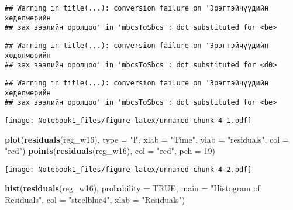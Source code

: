 \documentclass[]{article}
\newenvironment{Shaded}{\begin{snugshade}}{\end{snugshade}}
\newcommand{\DataTypeTok}[1]{\textcolor[rgb]{0.13,0.29,0.53}{#1}}
\newcommand{\DecValTok}[1]{\textcolor[rgb]{0.00,0.00,0.81}{#1}}
\newcommand{\KeywordTok}[1]{\textcolor[rgb]{0.13,0.29,0.53}{\textbf{#1}}}
\newcommand{\NormalTok}[1]{#1}
\newcommand{\OperatorTok}[1]{\textcolor[rgb]{0.81,0.36,0.00}{\textbf{#1}}}
\newcommand{\OtherTok}[1]{\textcolor[rgb]{0.56,0.35,0.01}{#1}}
\newcommand{\StringTok}[1]{\textcolor[rgb]{0.31,0.60,0.02}{#1}}
\begin{document}
\begin{verbatim}
## Warning in title(...): conversion failure on 'Эрэгтэйчүүдийн хөдөлмөрийн
## зах зээлийн оролцоо' in 'mbcsToSbcs': dot substituted for <be>
\end{verbatim}

\begin{verbatim}
## Warning in title(...): conversion failure on 'Эрэгтэйчүүдийн хөдөлмөрийн
## зах зээлийн оролцоо' in 'mbcsToSbcs': dot substituted for <d0>
\end{verbatim}

\begin{verbatim}
## Warning in title(...): conversion failure on 'Эрэгтэйчүүдийн хөдөлмөрийн
## зах зээлийн оролцоо' in 'mbcsToSbcs': dot substituted for <be>
\end{verbatim}

\begin{Shaded}
\end{Shaded}

\texttt{[image: Notebook1\_files/figure-latex/unnamed-chunk-4-1.pdf]}

\begin{Shaded}
\begin{Highlighting}[]
\KeywordTok{plot}\NormalTok{(}\KeywordTok{residuals}\NormalTok{(reg_w16), }
     \DataTypeTok{type =} \StringTok{"l"}\NormalTok{, }
     \DataTypeTok{xlab =} \StringTok{"Time"}\NormalTok{,}
     \DataTypeTok{ylab =} \StringTok{"residuals"}\NormalTok{,}
     \DataTypeTok{col  =} \StringTok{"red"}\NormalTok{)}
\KeywordTok{points}\NormalTok{(}\KeywordTok{residuals}\NormalTok{(reg_w16), }\DataTypeTok{col =} \StringTok{"red"}\NormalTok{, }\DataTypeTok{pch =} \DecValTok{19}\NormalTok{)}
\end{Highlighting}
\end{Shaded}

\texttt{[image: Notebook1\_files/figure-latex/unnamed-chunk-4-2.pdf]}

\begin{Shaded}
\begin{Highlighting}[]
\KeywordTok{hist}\NormalTok{(}\KeywordTok{residuals}\NormalTok{(reg_w16), }\DataTypeTok{probability =} \OtherTok{TRUE}\NormalTok{, }
     \DataTypeTok{main =} \StringTok{"Histogram of Residuals"}\NormalTok{, }
     \DataTypeTok{col  =} \StringTok{"steelblue4"}\NormalTok{, }
     \DataTypeTok{xlab =} \StringTok{"Residuals"}\NormalTok{)}
\end{Highlighting}
\end{Shaded}
\end{document}
